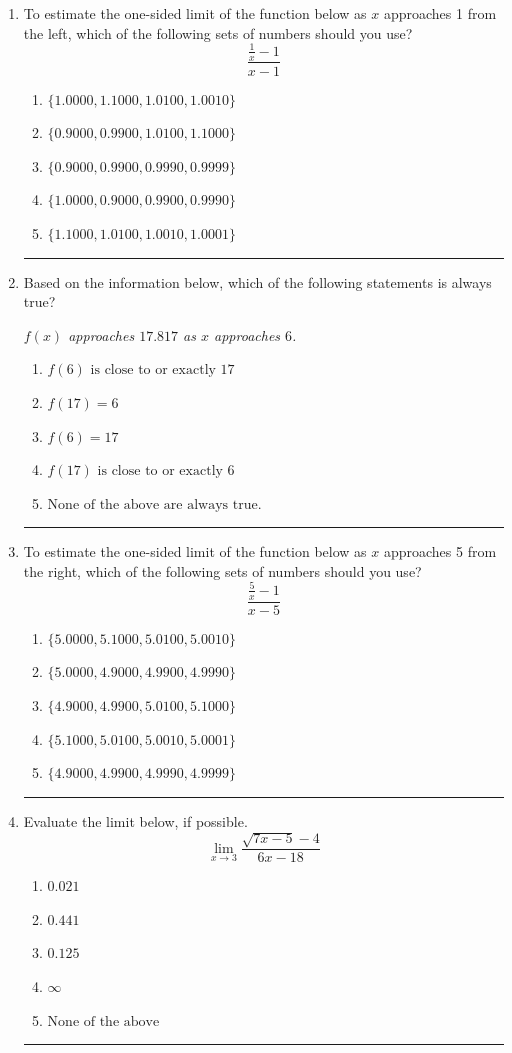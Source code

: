 \documentclass[14pt]{extbook}
\newcommand{\litem}[1]{\item#1\hspace*{-1cm}\rule{\textwidth}{0.4pt}}
\begin{document}
\begin{enumerate}
{\begin{enumerate}[label=\Alph*.]
\end{enumerate} }
\litem{
To estimate the one-sided limit of the function below as $x$ approaches 1 from the left, which of the following sets of numbers should you use?\[ \frac{\frac{1}{x} - 1}{x - 1} \]\begin{enumerate}[label=\Alph*.]
\item \( \{ 1.0000, 1.1000, 1.0100, 1.0010 \} \)
\item \( \{ 0.9000, 0.9900, 1.0100, 1.1000 \} \)
\item \( \{ 0.9000, 0.9900, 0.9990, 0.9999 \} \)
\item \( \{ 1.0000, 0.9000, 0.9900, 0.9990 \} \)
\item \( \{ 1.1000, 1.0100, 1.0010, 1.0001 \} \)

\end{enumerate} }
\litem{
Based on the information below, which of the following statements is always true?
\begin{center}
    \textit{ $f(x)$ approaches $17.817$ as $x$ approaches $6$. }
\end{center}
\begin{enumerate}[label=\Alph*.]
\item \( f(6) \text{ is close to or exactly } 17 \)
\item \( f(17) = 6 \)
\item \( f(6) = 17 \)
\item \( f(17) \text{ is close to or exactly } 6 \)
\item \( \text{None of the above are always true.} \)

\end{enumerate} }
\litem{
To estimate the one-sided limit of the function below as $x$ approaches 5 from the right, which of the following sets of numbers should you use?\[ \frac{\frac{5}{x} - 1}{x - 5} \]\begin{enumerate}[label=\Alph*.]
\item \( \{ 5.0000, 5.1000, 5.0100, 5.0010 \} \)
\item \( \{ 5.0000, 4.9000, 4.9900, 4.9990 \} \)
\item \( \{ 4.9000, 4.9900, 5.0100, 5.1000 \} \)
\item \( \{ 5.1000, 5.0100, 5.0010, 5.0001 \} \)
\item \( \{ 4.9000, 4.9900, 4.9990, 4.9999 \} \)

\end{enumerate} }
\litem{
Evaluate the limit below, if possible.\[ \lim_{x \rightarrow 3} \frac{\sqrt{7x - 5} - 4}{6x - 18} \]\begin{enumerate}[label=\Alph*.]
\item \( 0.021 \)
\item \( 0.441 \)
\item \( 0.125 \)
\item \( \infty \)
\item \( \text{None of the above} \)

\end{enumerate} }
\end{enumerate}
\end{document}
